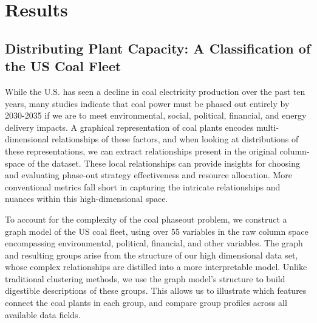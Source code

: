 \section{Results}

\subsection{Distributing Plant Capacity: A Classification of the US Coal Fleet}

While the U.S. has seen a decline in coal electricity production over the past ten years, many studies indicate that coal power must be phased out entirely 
by 2030-2035 if we are to meet environmental, social, political, financial, and energy delivery impacts. A graphical representation of coal plants encodes 
multi-dimensional relationships of these factors, and when looking at distributions of these representations, we can extract relationships present in the original 
column-space of the dataset. These local relationships can provide insights for choosing and evaluating phase-out strategy effectiveness and resource allocation. 
More conventional metrics fall short in capturing the intricate relationships and nuances within this high-dimensional space.

To account for the complexity of the coal phaseout problem, we construct a graph model of the US coal fleet, using over 55 variables in the raw column space 
encompassing environmental, political, financial, and other variables. The graph and resulting groups arise from the structure of our high dimensional data set, 
whose complex relationships are distilled into a more interpretable model. Unlike traditional clustering methods, we use the graph model’s structure to build 
digestible descriptions of these groups. This allows us to illustrate which features connect the coal plants in each group, and compare group profiles across all 
available data fields.

\vspace{\baselineskip}



